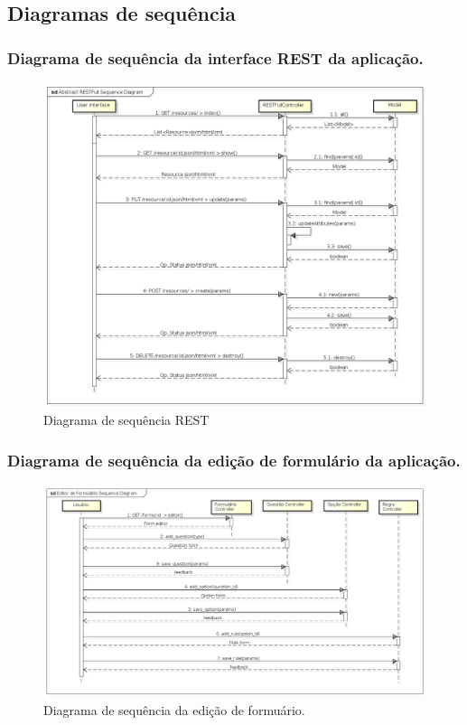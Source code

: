 \documentclass[11pt]{article}
\begin{document}
  \clearpage
  
    \subsection{Diagramas de sequência}
    
      \subsubsection{Diagrama de sequência da interface REST da aplicação.}

        \begin{figure}[h!]
          \centering
          \includegraphics[width=1.0\textwidth]{sequence_diagram_main.png}
          \caption{Diagrama de sequência REST}
        \end{figure}
        
  \clearpage
    
      \subsubsection{Diagrama de sequência da edição de formulário da aplicação.}

        \begin{figure}[h!]
          \centering
          \includegraphics[width=1.0\textwidth]{sequence_diagram_editor.png}
          \caption{Diagrama de sequência da edição de formuário.}
        \end{figure}
        
\end{document}
